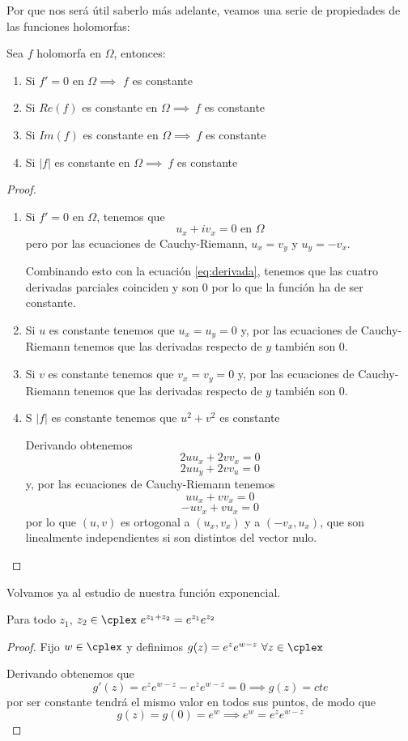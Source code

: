 \documentclass{apuntes}
\begin{document}
Por que nos será útil saberlo más adelante, veamos una serie de propiedades de las funciones holomorfas:
\begin{prop}
Sea $f$ holomorfa en $\Omega$, entonces:
\begin{enumerate}
\item Si $f'=0$ en $\Omega \implies $ $f$ es constante
\item Si $Re(f)$ es constante en $\Omega \implies \ f$ es constante
\item Si $Im(f)$ es constante en $\Omega \implies \ f$ es constante
\item Si $|f|$ es constante en $\Omega \implies \ f$ es constante
\end{enumerate}
\end{prop}
\begin{proof}
\begin{enumerate}
\item Si $f'=0$ en $\Omega$, tenemos que
\begin{equation}\label{eq:derivada}
u_x+iv_x = 0 \text{ en }\Omega
\end{equation}
pero por las ecuaciones de Cauchy-Riemann, $u_x=v_y$ y $u_y=-v_x$.

Combinando esto con la ecuación \eqref{eq:derivada}, tenemos que las cuatro derivadas parciales coinciden y son 0 por lo que la función ha de ser constante.

\item Si $u$ es constante tenemos que $u_x=u_y=0$ y, por las ecuaciones de Cauchy-Riemann tenemos que las derivadas respecto de $y$ también son 0.

\item Si $v$ es constante tenemos que $v_x=v_y=0$ y, por las ecuaciones de Cauchy-Riemann tenemos que las derivadas respecto de $y$ también son 0.

\item S $|f|$ es constante tenemos que $u^2+v^2$ es constante

Derivando obtenemos
\[2uu_x+2vv_x=0\]
\[2uu_y+2vv_u=0\]
y, por las ecuaciones de Cauchy-Riemann tenemos
\[uu_x+vv_x =0\]
\[-uv_x+vu_x = 0\]
por lo que $(u,v)$ es ortogonal a $(u_x,v_x)$ y a $(-v_x,u_x)$, que son linealmente independientes si son distintos del vector nulo.

\end{enumerate}
\end{proof}

Volvamos ya al estudio de nuestra función exponencial.
\begin{prop}
Para todo $z_1$, $z_2 \in \cplex \ e^{z_1+z_2}=e^{z_1}e^{z_2}$
\end{prop}
\begin{proof}
Fijo $w \in \cplex$ y definimos $g(z)=e^z e^{w-z} \ \forall z \in \cplex$

Derivando obtenemos que
\[g'(z)=e^z e^{w-z}-e^ze^{w-z}=0 \implies g(z)=cte\]
por ser constante tendrá el mismo valor en todos sus puntos, de modo que
\[g(z)=g(0)=e^w \implies e^w=e^ze^{w-z}\]
\end{proof}
\end{document}

